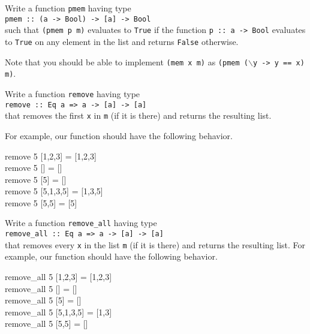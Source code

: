 \documentclass[11pt]{article}
\begin{document}
\begin{exercise}
Write a function {\tt{pmem}} having type \\{\mbox{\hspace{.25in}}}{\tt{pmem ::
(a -> Bool) -> [a] -> Bool}}\\ such that {\tt{(pmem p m)}} evaluates to
{\tt{True}} if the function {\tt{p :: a -> Bool}} evaluates to {\tt{True}} on
any element in the list and returns {\tt{False}} otherwise.

Note that you should be able to implement {\tt{(mem x m)}} as {\tt{(pmem ($\backslash$y ->
y == x) m)}}.
\end{exercise}

\begin{exercise}
Write a function {\tt{remove}} having type \\{\mbox{\hspace{.25in}}}{\tt{remove
:: Eq a => a -> [a] -> [a]}}\\ that removes the first {\tt{x}} in {\tt{m}} (if
it is there) and returns the resulting list.

For example, our function should have the following behavior.
\begin{program*}
\>  remove 5 [1,2,3] = [1,2,3]   \\
\>  remove 5 [] = []   \\
\>  remove 5 [5] = []   \\
\>  remove 5 [5,1,3,5] = [1,3,5]   \\
\>  remove 5 [5,5] = [5]   \\
\end{program*}
\end{exercise}


\begin{exercise}
Write a function {\tt{remove\_all}} having type
\\{\mbox{\hspace{.25in}}}{\tt{remove\_all :: Eq a => a -> [a] -> [a]}}\\ that
removes every {\tt{x}} in the list {\tt{m}} (if it is there) and returns the
resulting list.
For example, our function should have the following behavior.
\begin{program*}
\>  remove\_all 5 [1,2,3] = [1,2,3]   \\
\>  remove\_all 5 [] = []   \\
\>  remove\_all 5 [5] = []   \\
\>  remove\_all 5 [5,1,3,5] = [1,3]   \\
\>  remove\_all 5 [5,5] = []   \\
\end{program*}
\end{exercise}
\end{document}
